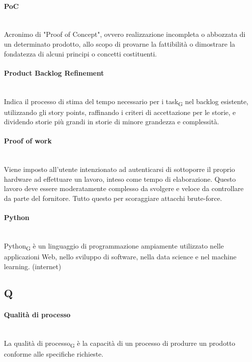 \paragraph{PoC}~\smallskip \\
Acronimo di "Proof of Concept", ovvero realizzazione incompleta o abbozzata di un determinato prodotto, allo scopo di provarne la fattibilità o dimostrare la fondatezza di alcuni principi o concetti costituenti.

\paragraph{Product Backlog Refinement}~\smallskip \\
Indica il processo di stima del tempo necessario per i task\textsubscript{G} nel backlog esistente, utilizzando gli story points, 
raffinando i criteri di accettazione per le storie, e dividendo storie più grandi in storie di minore grandezza e complessità.

\paragraph{Proof of work}~\smallskip \\
Viene imposto all'utente intenzionato ad autenticarsi di sottoporre il proprio hardware ad effettuare un lavoro, inteso come tempo di elaborazione. Questo lavoro deve essere moderatamente complesso da svolgere e veloce da controllare da parte del fornitore. Tutto questo per scoraggiare attacchi brute-force.

\paragraph{Python}~\smallskip \\
Python\textsubscript{G} è un linguaggio di programmazione ampiamente utilizzato nelle applicazioni Web, nello sviluppo di software, nella data science e nel machine learning. (internet)
\newpage
{}
\subsection*{Q}
\paragraph{Qualità di processo}~\smallskip \\
La qualità di processo\textsubscript{G} è la capacità di un processo di produrre un prodotto conforme alle specifiche richieste.

